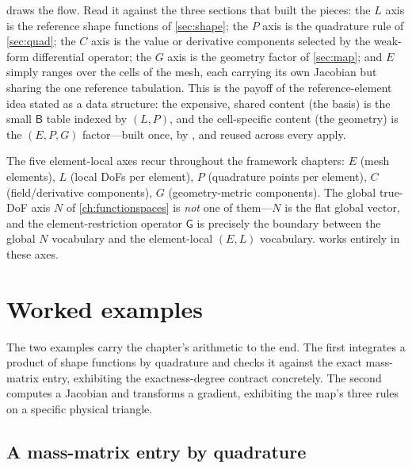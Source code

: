  draws the flow. Read it against the three sections that built
the pieces: the $L$ axis is the reference shape functions of \cref{sec:shape}; the
$P$ axis is the quadrature rule of \cref{sec:quad}; the $C$ axis is the value or
derivative components selected by the weak-form differential operator; the $G$ axis is
the geometry factor of \cref{sec:map}; and $E$ simply ranges over the cells of the
mesh, each carrying its own Jacobian but sharing the one reference tabulation. This is
the payoff of the reference-element idea stated as a data structure: the expensive,
shared content (the basis) is the small $\mathsf{B}$ table indexed by $(L,P)$, and the
cell-specific content (the geometry) is the $(E,P,G)$ factor---built once, by
, and reused across every apply.

\begin{notationbox}
The five element-local axes recur throughout the framework chapters:
$E$ (mesh elements), $L$ (local DoFs per element), $P$ (quadrature points per
element), $C$ (field/derivative components), $G$ (geometry-metric components). The
global true-DoF axis $N$ of \cref{ch:functionspaces} is \emph{not} one of
them---$N$ is the flat global vector, and the element-restriction operator
$\mathsf{G}$ is precisely the boundary between the global $N$ vocabulary and the
element-local $(E,L)$ vocabulary.  works entirely in these axes.
\end{notationbox}

\section{Worked examples}

The two examples carry the chapter's arithmetic to the end. The first integrates a
product of shape functions by quadrature and checks it against the exact mass-matrix
entry, exhibiting the exactness-degree contract concretely. The second computes a
Jacobian and transforms a gradient, exhibiting the map's three rules on a specific
physical triangle.

\subsection{A mass-matrix entry by quadrature}

